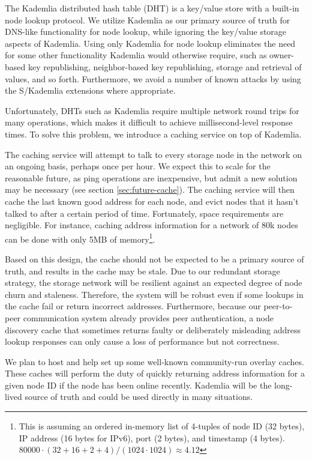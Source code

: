 \documentclass[11pt,fleqn,openany]{book}
\begin{document}
The Kademlia distributed hash table (DHT) is a key/value store with a built-in node lookup protocol.
We utilize Kademlia as our primary source of truth for DNS-like
functionality for node lookup, while ignoring the key/value storage aspects of
Kademlia.
Using only Kademlia for node lookup eliminates the need for some other
functionality Kademlia would otherwise require, such as owner-based key
republishing, neighbor-based key republishing, storage and retrieval of values,
and so forth. Furthermore, we avoid a number of known attacks by using the
S/Kademlia \cite{skad} extensions where appropriate.

Unfortunately, DHTs such as Kademlia require multiple network round trips for
many operations, which makes it difficult to achieve millisecond-level
response times. To solve this problem, we introduce a caching service on top
of Kademlia.

The caching service will attempt to talk to every storage node in the network
on an ongoing basis, perhaps once per hour. We expect this to scale for the
reasonable future, as ping operations are inexpensive, but admit a new solution
may be necessary (see section \ref{sec:future-cache}).
The caching service will then cache
the last known good address for each node, and evict nodes that it hasn't talked
to after a certain period of time.
Fortunately, space requirements are negligible. For instance, caching address information for a network of 80k nodes
can be done with only 5MB of memory\footnote{
This is assuming an ordered in-memory list of 4-tuples of node ID (32 bytes),
IP address (16 bytes for IPv6), port (2 bytes), and timestamp (4 bytes).
$80000\cdot(32+16+2+4)/(1024\cdot 1024) \approx 4.12$
}.

Based on this design, the cache should not be expected to be a primary source
of truth, and results in the cache may be stale. Due to our redundant
storage strategy, the storage network will be resilient against an expected
degree of node churn and staleness.
Therefore, the system will be robust even if some lookups in the cache
fail or return incorrect addresses.
Furthermore, because our peer-to-peer communication
system already provides peer authentication, a node discovery cache that
sometimes returns faulty
or deliberately misleading address lookup responses can only cause a
loss of performance but not correctness.

We plan to host and help set up some well-known community-run overlay caches.
These caches will perform the duty of quickly returning address information
for a given node ID if the node has been online recently. Kademlia will be the
long-lived source of truth and could be used directly in many situations.
\end{document}
